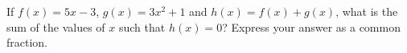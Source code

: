 If $f(x)=5x-3$, $g(x)=3x^2+1$ and $h(x)=f(x)+g(x)$, what is the sum of the values of $x$ such that $h(x)=0$? Express your answer as a common fraction.
